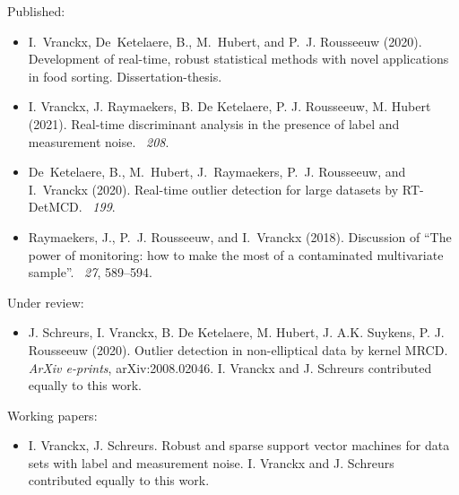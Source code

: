 \documentclass[10pt,a4paper]{article}
\begin{document}
\spacedhrule{0.5em}{-0.4em}


\inlineheadsection  %
{Published:}
{ 
	\begin{itemize}
		\item I.~Vranckx, De~Ketelaere, B., M.~Hubert, and P.~J. Rousseeuw (2020). Development of real-time, robust statistical methods with novel applications in food sorting. Dissertation-thesis. 	
	\item I. Vranckx, J. Raymaekers, B. De Ketelaere, P. J. Rousseeuw, M. Hubert (2021).
	\newblock Real-time discriminant analysis in the presence of label and measurement noise.
	~{\em 208}.	
	
	\item De~Ketelaere, B., M.~Hubert, J.~Raymaekers, P.~J. Rousseeuw, and I.~Vranckx	(2020).
	\newblock Real-time outlier detection for large datasets by {RT-DetMCD}.
	~{\em 199}. 		
	
	\item Raymaekers, J., P.~J. Rousseeuw, and I.~Vranckx (2018).
	\newblock Discussion of ``{T}he power of monitoring: how to make the most of a contaminated multivariate sample''.
	~{\em 27}, 589--594. 
	\end{itemize}
}
\vspace{0.5em}
\inlineheadsection
{Under review:}
{

\begin{itemize}
	\item 	J. Schreurs, I. Vranckx, B. De Ketelaere, M. Hubert, J. A.K. Suykens, P. J. Rousseeuw (2020). Outlier detection in non-elliptical data by kernel MRCD. \textit{ArXiv e-prints}, arXiv:2008.02046. I. Vranckx and J. Schreurs contributed equally to this work.
\end{itemize}
}

\vspace{0.5em}
\inlineheadsection
{Working papers:}
{	
\begin{itemize}
	\item 	I. Vranckx, J. Schreurs. Robust and sparse support vector machines for data sets with label and measurement noise. I. Vranckx and J. Schreurs contributed equally to this work.
\end{itemize}
}
\end{document}
